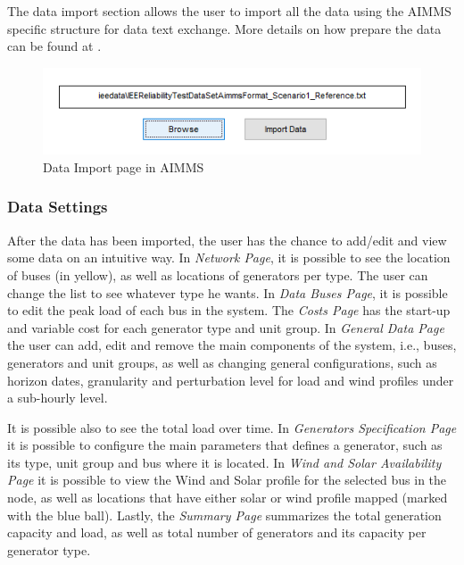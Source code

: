 \documentclass[12pt,LUDisStyle,twosided]{book}
\begin{document}
The data import section allows the user to import all the data using the AIMMS specific structure for data text exchange. More details on how prepare the data can be found at \cite{bisschop2006aimms}.

\begin{figure}[h] 
	\begin{center}
		\includegraphics[keepaspectratio]{aimmsScreenImportPage.png}
	  	\caption{Data Import page in AIMMS}
     	\label{fig:aimmsScreenImportPage}
	\end{center}
\end{figure}

\subsubsection{Data Settings}

After the data has been imported, the user has the chance to add/edit and view some data on an intuitive way. In \textit{Network Page}, it is possible to see the location of buses (in yellow), as well as locations of generators per type. The user can change the list to see whatever type he wants. In \textit{Data Buses Page}, it is possible to edit the peak load of each bus in the system. The \textit{Costs Page} has the start-up and variable cost for each generator type and unit group. In \textit{General Data Page} the user can add, edit and remove the main components of the system, i.e., buses, generators and unit groups, as well as changing general configurations, such as horizon dates, granularity and perturbation level for load and wind profiles under a sub-hourly level. 

It is possible also to see the total load over time. In \textit{Generators Specification Page} it is possible to configure the main parameters that defines a generator, such as its type, unit group and bus where it is located. In \textit{Wind and Solar Availability Page} it is possible to view the Wind and Solar profile for the selected bus in the node, as well as locations that have either solar or wind profile mapped (marked with the blue ball). Lastly, the \textit{Summary Page} summarizes the total generation capacity and load, as well as total number of generators and its capacity per generator type.
\end{document}
